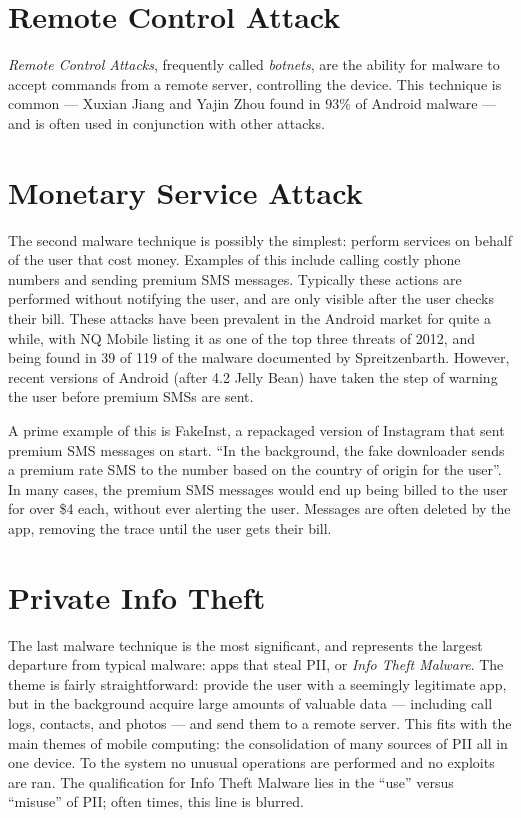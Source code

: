 \section{Remote Control Attack}
\textit{Remote Control Attacks}, frequently called \textit{botnets}, are the ability for malware to accept commands from a remote server, controlling the device. This technique is common --- Xuxian Jiang
 and Yajin Zhou\citep{zhou2012dissecting} found in 93\% of Android malware --- and is often used in conjunction with other attacks\citep{spreitzenbarth2013}.

\section{Monetary Service Attack}
\label{sec:premiumsms}
The second malware technique is possibly the simplest: perform services on behalf of the user that cost money. Examples of this include calling costly phone numbers and sending premium SMS messages. Typically these actions are performed without notifying the user, and are only visible after the user checks their bill. These attacks have been prevalent in the Android market for quite a while, with NQ Mobile\citep{nq2013} listing it as one of the top three threats of 2012, and being found in 39 of 119 of the malware documented by Spreitzenbarth\citep{spreitzenbarth2013}. However, recent versions of Android (after 4.2 Jelly Bean\citep{androidjbsecurity}) have taken the step of warning the user before premium SMSs are sent. %

A prime example of this is FakeInst\citep{avastfakeinst}, a repackaged version of Instagram\citep{instagramandroid} that sent premium SMS messages on start. ``In the background, the fake downloader sends a premium rate SMS to the number based on the country of origin for the user''\citep{avastfakeinst}. In many cases, the premium SMS messages would end up being billed to the user for over \$4 each\citep{avastfakeinst}, without ever alerting the user. Messages are often deleted by the app, removing the trace until the user gets their bill.

\section{Private Info Theft}
The last malware technique is the most significant, and represents the largest departure from typical malware: apps that steal PII, or \textit{Info Theft Malware}. The theme is fairly straightforward: provide the user with a seemingly legitimate app, but in the background acquire large amounts of valuable data --- including call logs, contacts, and photos --- and send them to a remote server. This fits with the main themes of mobile computing: the consolidation of many sources of PII all in one device. 
To the system no unusual operations are performed and no exploits are ran. The qualification for Info Theft Malware lies in the ``use'' versus ``misuse'' of PII; often times, this line is blurred.

